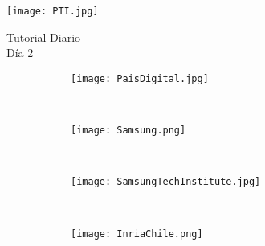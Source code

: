 \begin{titlepage} %
  \thispagestyle{empty} %
  \begin{flushleft} %
    \texttt{[image: PTI.jpg]}
  \end{flushleft}
  \vfill
  \vspace{2cm} %
  \begin{center} %
    {
      \Huge Tutorial Diario\\
      \huge Día 2\\
    }
  \end{center}

  \vspace{5cm}

  \begin{figure}[H]
    \centering
    \begin{subfigure}[b]{0.2\textwidth}
      \centering
      \texttt{[image: PaisDigital.jpg]}
      \label{fig:Viper}
    \end{subfigure}
    ~
    \begin{subfigure}[b]{0.4\textwidth}
      \centering
      \texttt{[image: Samsung.png]}
      \label{fig:Phyrex}
    \end{subfigure}
    ~
    \begin{subfigure}[b]{0.23\textwidth}
      \centering
      \texttt{[image: SamsungTechInstitute.jpg]}
      \label{fig:Viper}
    \end{subfigure}
    ~\\
    \begin{subfigure}[b]{0.4\textwidth}
      \centering
      \texttt{[image: InriaChile.png]}
      \label{fig:Phyrex}
    \end{subfigure}
  \end{figure}

  \vfill
\end{titlepage}
